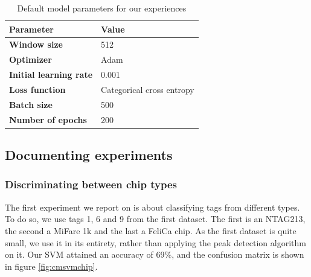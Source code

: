\begin{table}[htbp!]
  \centering
  \begin{tabular}{|l|l|}
    \hline
    \textbf{Parameter}             & \textbf{Value}            \\ \hline \hline
    \textbf{Window size}           & 512                       \\ \hline
    \textbf{Optimizer}             & Adam                      \\ \hline
    \textbf{Initial learning rate} & 0.001                     \\ \hline
    \textbf{Loss function}         & Categorical cross entropy \\ \hline
    \textbf{Batch size}            & 500                       \\ \hline
    \textbf{Number of epochs}      & 200                       \\ \hline
  \end{tabular}
  \caption{Default model parameters for our experiences}
  \label{tab:parameters}
\end{table}

\subsection{Documenting experiments}

\subsubsection{Discriminating between chip types}

The first experiment we report on is about classifying tags from different types. To do so, we use tags 1, 6 and 9 from the first dataset. The first is an NTAG213, the second a MiFare 1k and the last a FeliCa chip. As the first dataset is quite small, we use it in its entirety, rather than applying the peak detection algorithm on it. Our SVM attained an accuracy of 69\%, and the confusion matrix is shown in figure \ref{fig:cmsvmchip}.


